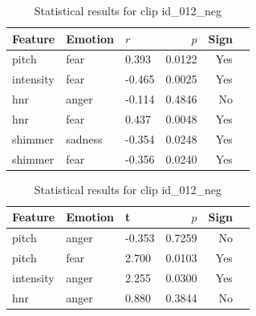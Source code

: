 \begin{table}[ht]
    \centering
    \begin{subtable}[t]{0.48\textwidth}
      \centering
      \caption{Clip id\_012\_neg – Pearson Correlation}
      \label{tab:clip012_pearson}
      \begin{tabular}{lllrrl}
        \toprule
        Feature               & Emotion & $r$ & $p$ & Sign \\
        \midrule
        pitch       & fear    &  0.393 & 0.0122 & Yes  \\
        intensity    & fear    & -0.465 & 0.0025 & Yes  \\
        hnr          & anger   & -0.114 & 0.4846 & No \\
        hnr          & fear    &  0.437 & 0.0048 & Yes  \\
        shimmer        & sadness & -0.354 & 0.0248 & Yes  \\
        shimmer         & fear    & -0.356 & 0.0240 & Yes  \\
        \bottomrule
      \end{tabular}
    \end{subtable}
    \hfill
    \begin{subtable}[t]{0.48\textwidth}
      \centering
      \caption{Clip id\_012\_neg – t-test}
      \label{tab:clip012_ttest}
      \begin{tabular}{lllrrl}
        \toprule
        Feature               & Emotion & t & $p$& Sign \\
        \midrule
        pitch        & anger   & -0.353 & 0.7259 & No \\
        pitch        & fear    &  2.700 & 0.0103 & Yes  \\
        intensity    & anger   &  2.255 & 0.0300 & Yes  \\
        hnr          & anger   &  0.880 & 0.3844 & No \\
        \bottomrule
      \end{tabular}
    \end{subtable}
    \caption{Statistical results for clip id\_012\_neg}
    \label{tab:clip012_stats}
  \end{table}

